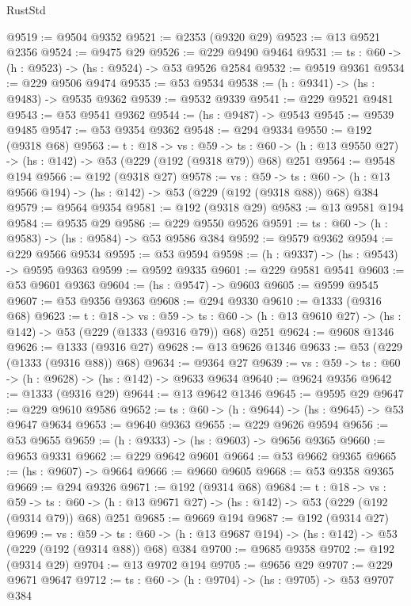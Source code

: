 \begin{lexlean}{RustStd}
\begin{coremodule}
@9519 := @9504 @9352
@9521 := @2353 (@9320 @29)
@9523 := @13 @9521 @2356
@9524 := @9475 @29
@9526 := @229 @9490 @9464
@9531 := {ts : @60} -> (h : @9523) -> (hs : @9524) -> @53 @9526 @2584
@9532 := @9519 @9361
@9534 := @229 @9506 @9474
@9535 := @53 @9534
@9538 := (h : @9341) -> (hs : @9483) -> @9535 @9362
@9539 := @9532 @9339
@9541 := @229 @9521 @9481
@9543 := @53 @9541 @9362
@9544 := (hs : @9487) -> @9543
@9545 := @9539 @9485
@9547 := @53 @9354 @9362
@9548 := @294 @9334
@9550 := @192 (@9318 @68)
@9563 := {t : @18} ->
  {vs : @59} ->
  {ts : @60} -> (h : @13 @9550 @27) -> (hs : @142) -> @53 (@229 (@192 (@9318 @79)) @68) @251
@9564 := @9548 @194
@9566 := @192 (@9318 @27)
@9578 := {vs : @59} ->
  {ts : @60} -> (h : @13 @9566 @194) -> (hs : @142) -> @53 (@229 (@192 (@9318 @88)) @68) @384
@9579 := @9564 @9354
@9581 := @192 (@9318 @29)
@9583 := @13 @9581 @194
@9584 := @9535 @29
@9586 := @229 @9550 @9526
@9591 := {ts : @60} -> (h : @9583) -> (hs : @9584) -> @53 @9586 @384
@9592 := @9579 @9362
@9594 := @229 @9566 @9534
@9595 := @53 @9594
@9598 := (h : @9337) -> (hs : @9543) -> @9595 @9363
@9599 := @9592 @9335
@9601 := @229 @9581 @9541
@9603 := @53 @9601 @9363
@9604 := (hs : @9547) -> @9603
@9605 := @9599 @9545
@9607 := @53 @9356 @9363
@9608 := @294 @9330
@9610 := @1333 (@9316 @68)
@9623 := {t : @18} ->
  {vs : @59} ->
  {ts : @60} -> (h : @13 @9610 @27) -> (hs : @142) -> @53 (@229 (@1333 (@9316 @79)) @68) @251
@9624 := @9608 @1346
@9626 := @1333 (@9316 @27)
@9628 := @13 @9626 @1346
@9633 := @53 (@229 (@1333 (@9316 @88)) @68)
@9634 := @9364 @27
@9639 := {vs : @59} -> {ts : @60} -> (h : @9628) -> (hs : @142) -> @9633 @9634
@9640 := @9624 @9356
@9642 := @1333 (@9316 @29)
@9644 := @13 @9642 @1346
@9645 := @9595 @29
@9647 := @229 @9610 @9586
@9652 := {ts : @60} -> (h : @9644) -> (hs : @9645) -> @53 @9647 @9634
@9653 := @9640 @9363
@9655 := @229 @9626 @9594
@9656 := @53 @9655
@9659 := (h : @9333) -> (hs : @9603) -> @9656 @9365
@9660 := @9653 @9331
@9662 := @229 @9642 @9601
@9664 := @53 @9662 @9365
@9665 := (hs : @9607) -> @9664
@9666 := @9660 @9605
@9668 := @53 @9358 @9365
@9669 := @294 @9326
@9671 := @192 (@9314 @68)
@9684 := {t : @18} ->
  {vs : @59} ->
  {ts : @60} -> (h : @13 @9671 @27) -> (hs : @142) -> @53 (@229 (@192 (@9314 @79)) @68) @251
@9685 := @9669 @194
@9687 := @192 (@9314 @27)
@9699 := {vs : @59} ->
  {ts : @60} -> (h : @13 @9687 @194) -> (hs : @142) -> @53 (@229 (@192 (@9314 @88)) @68) @384
@9700 := @9685 @9358
@9702 := @192 (@9314 @29)
@9704 := @13 @9702 @194
@9705 := @9656 @29
@9707 := @229 @9671 @9647
@9712 := {ts : @60} -> (h : @9704) -> (hs : @9705) -> @53 @9707 @384

\end{coremodule}
\end{lexlean}
